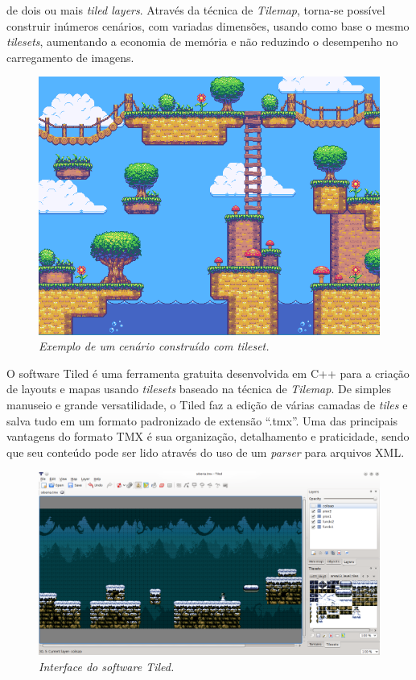 de dois ou mais \textit{tiled layers}. Através da técnica de \textit{Tilemap}, torna-se possível construir inúmeros cenários,
com variadas dimensões, usando como base o mesmo \textit{tilesets}, aumentando a economia de memória e não reduzindo o desempenho 
no carregamento de imagens.
%
%
%
\begin{figure}[H]
    \centering
    \includegraphics[scale = 0.65]{Imagens/cenario.png}
    \caption{\textit{Exemplo de um cenário construído com tileset.}}
    \label{cenario_example}
\end{figure}
%
%
\par
O software Tiled \cite{SiteTiled} é uma ferramenta gratuita desenvolvida em C++ para a criação de layouts e mapas usando \textit{tilesets}
baseado na técnica de \textit{Tilemap}. De simples manuseio e grande versatilidade, o Tiled faz a edição de várias camadas 
de \textit{tiles} e salva tudo em um formato padronizado de extensão ``.tmx''. Uma das principais vantagens do formato TMX é sua organização, 
detalhamento e praticidade, sendo que seu conteúdo pode ser lido através do uso de um \textit{parser} para arquivos XML.
%
\begin{figure}[H]
    \centering
    \includegraphics[scale = 0.45]{Imagens/Tiled.png}
    \caption{\textit{Interface do \textit{software} Tiled.}}
    \label{tiled_interface}
\end{figure}
